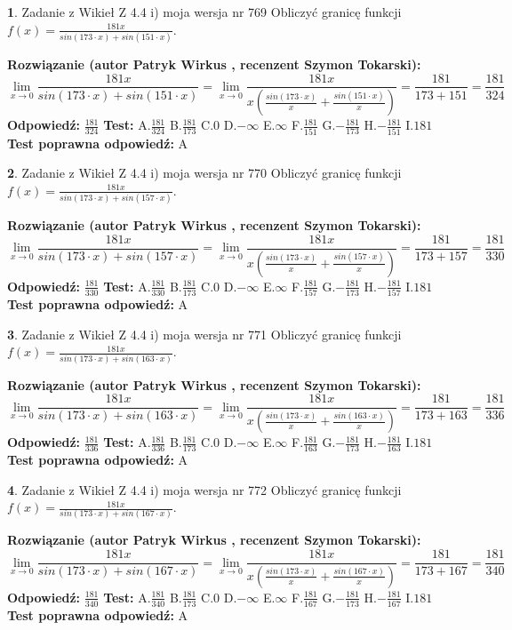 \documentclass[12pt, a4paper]{article}
\theoremstyle{definition} %
\newtheorem{zad}{}
\newcommand{\zadStart}[1]{\begin{zad}#1\newline}
\newcommand{\zadStop}{\end{zad}}
\newcommand{\rozwStart}[2]{\noindent \textbf{Rozwiązanie (autor #1 , recenzent #2): }\newline}
\newcommand{\rozwStop}{\newline}
\newcommand{\odpStart}{\noindent \textbf{Odpowiedź:}\newline}
\newcommand{\odpStop}{\newline}
\newcommand{\testStart}{\noindent \textbf{Test:}\newline}
\newcommand{\testStop}{\newline}
\newcommand{\kluczStart}{\noindent \textbf{Test poprawna odpowiedź:}\newline}
\newcommand{\kluczStop}{\newline}
\begin{document}
\zadStart{Zadanie z Wikieł Z 4.4 i) moja wersja nr 769}
Obliczyć granicę funkcji $f(x)=\frac{181x}{sin(173\cdot x) +sin(151\cdot x)}$.
\zadStop
\rozwStart{Patryk Wirkus}{Szymon Tokarski}
$$\lim\limits_{x\to 0}\frac{181x}{sin(173\cdot x) +sin(151\cdot x)}=\lim\limits_{x\to 0}\frac{181x}{x(\frac{sin(173\cdot x)}{x}+\frac{sin(151\cdot x)}{x})}=\frac{181}{173+151} = \frac{181}{324}$$
\rozwStop
\odpStart
$\frac{181}{324}$
\odpStop
\testStart
A.$\frac{181}{324}$
B.$\frac{181}{173}$
C.$0$
D.$-\infty$
E.$\infty$
F.$\frac{181}{151}$
G.$-\frac{181}{173}$
H.$-\frac{181}{151}$
I.$181$
\testStop
\kluczStart
A
\kluczStop



\zadStart{Zadanie z Wikieł Z 4.4 i) moja wersja nr 770}
Obliczyć granicę funkcji $f(x)=\frac{181x}{sin(173\cdot x) +sin(157\cdot x)}$.
\zadStop
\rozwStart{Patryk Wirkus}{Szymon Tokarski}
$$\lim\limits_{x\to 0}\frac{181x}{sin(173\cdot x) +sin(157\cdot x)}=\lim\limits_{x\to 0}\frac{181x}{x(\frac{sin(173\cdot x)}{x}+\frac{sin(157\cdot x)}{x})}=\frac{181}{173+157} = \frac{181}{330}$$
\rozwStop
\odpStart
$\frac{181}{330}$
\odpStop
\testStart
A.$\frac{181}{330}$
B.$\frac{181}{173}$
C.$0$
D.$-\infty$
E.$\infty$
F.$\frac{181}{157}$
G.$-\frac{181}{173}$
H.$-\frac{181}{157}$
I.$181$
\testStop
\kluczStart
A
\kluczStop



\zadStart{Zadanie z Wikieł Z 4.4 i) moja wersja nr 771}
Obliczyć granicę funkcji $f(x)=\frac{181x}{sin(173\cdot x) +sin(163\cdot x)}$.
\zadStop
\rozwStart{Patryk Wirkus}{Szymon Tokarski}
$$\lim\limits_{x\to 0}\frac{181x}{sin(173\cdot x) +sin(163\cdot x)}=\lim\limits_{x\to 0}\frac{181x}{x(\frac{sin(173\cdot x)}{x}+\frac{sin(163\cdot x)}{x})}=\frac{181}{173+163} = \frac{181}{336}$$
\rozwStop
\odpStart
$\frac{181}{336}$
\odpStop
\testStart
A.$\frac{181}{336}$
B.$\frac{181}{173}$
C.$0$
D.$-\infty$
E.$\infty$
F.$\frac{181}{163}$
G.$-\frac{181}{173}$
H.$-\frac{181}{163}$
I.$181$
\testStop
\kluczStart
A
\kluczStop



\zadStart{Zadanie z Wikieł Z 4.4 i) moja wersja nr 772}
Obliczyć granicę funkcji $f(x)=\frac{181x}{sin(173\cdot x) +sin(167\cdot x)}$.
\zadStop
\rozwStart{Patryk Wirkus}{Szymon Tokarski}
$$\lim\limits_{x\to 0}\frac{181x}{sin(173\cdot x) +sin(167\cdot x)}=\lim\limits_{x\to 0}\frac{181x}{x(\frac{sin(173\cdot x)}{x}+\frac{sin(167\cdot x)}{x})}=\frac{181}{173+167} = \frac{181}{340}$$
\rozwStop
\odpStart
$\frac{181}{340}$
\odpStop
\testStart
A.$\frac{181}{340}$
B.$\frac{181}{173}$
C.$0$
D.$-\infty$
E.$\infty$
F.$\frac{181}{167}$
G.$-\frac{181}{173}$
H.$-\frac{181}{167}$
I.$181$
\testStop
\kluczStart
A
\kluczStop
\end{document}
